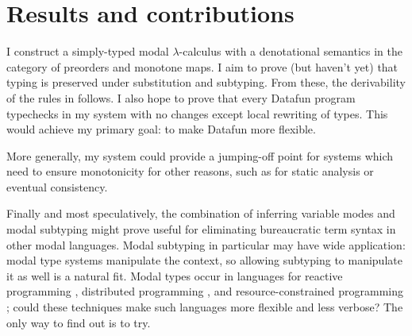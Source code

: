 \documentclass[sigplan,screen,dvipsnames]{acmart}
\newcommand\todo[1]{{\color{Purple}#1}}
\newcommand\fn\lambda
\begin{document}



\section{Results and contributions}

I construct a simply-typed modal $\fn$-calculus with a denotational semantics in
the category of preorders and monotone maps. I aim to prove (but haven't yet)
that typing is preserved under substitution and subtyping. From these, the
derivability of the rules in \citet{jrml} follows. I also hope to prove that
every Datafun program typechecks in my system with no changes except local
rewriting of types. This would achieve my primary goal: to make Datafun more
flexible.

More generally, my system could provide a jumping-off point for systems which
need to ensure monotonicity for other reasons, such as for static analysis or
eventual consistency.

Finally and most speculatively, the combination of inferring variable modes and
modal subtyping might prove useful for eliminating bureaucratic term syntax in
other modal languages. Modal subtyping in particular may have wide application:
modal type systems manipulate the context, so allowing subtyping to manipulate
it as well is a natural fit. Modal types occur in languages for reactive
programming \cite{Krishnaswami13:simple-frp}, distributed programming
\cite{ml5}, and resource-constrained programming
\cite{context-constrained,DBLP:conf/esop/GhicaS14}; could these techniques make
such languages more flexible and less verbose? The only way to find out is to
try.







\end{document}
